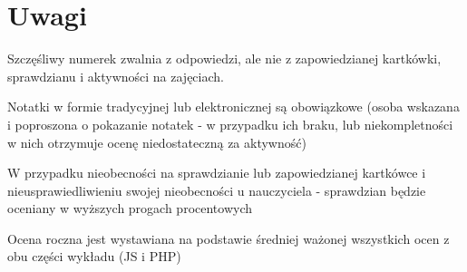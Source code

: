 \documentclass[a4paper]{article}
\begin{document}
\section*{Uwagi}
Szczęśliwy numerek zwalnia z odpowiedzi, ale nie z zapowiedzianej kartkówki, sprawdzianu i aktywności na zajęciach.

Notatki w formie tradycyjnej lub elektronicznej są obowiązkowe (osoba wskazana i poproszona o pokazanie notatek - w przypadku ich braku, lub niekompletności w nich otrzymuje ocenę niedostateczną za aktywność)

W przypadku nieobecności na sprawdzianie lub zapowiedzianej kartkówce i nieusprawiedliwieniu swojej nieobecności u nauczyciela - sprawdzian będzie oceniany w wyższych progach procentowych

Ocena roczna jest wystawiana na podstawie średniej ważonej wszystkich ocen z obu części wykładu (JS i PHP)
\end{document}
